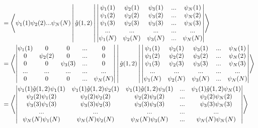 \documentclass[a4paper]{article}
\begin{document}
 \begin{equation}
 \begin{aligned}
 &= \Braket{  \psi_1(1)\psi_2(2)...\psi_N(N)  | \hat{g}(1,2) |
\begin{vmatrix} \psi_1(1) & \psi_2(1)& \psi_3(1) & ... & \psi_N(1) \\
    \psi_1(2) & \psi_2(2) & \psi_3(2) &...& \psi_N(2) \\
    \psi_1(3) & \psi_2(3) & \psi_3(3) &...& \psi_N(3) \\
    ... & ... & ... & ...& ... \\
    \psi_1(N) & \psi_2(N) & \psi_3(N) &...& \psi_N(N)\\
    \end{vmatrix} } \\
    &=
    \Braket{ 
     \begin{vmatrix} \psi_1(1) &0 & 0&... & 0 \\
    0 & \psi_2(2) & 0& ...& 0\\
    0 & 0 & \psi_3(3)& ...& 0\\
    ... & ... & ... & ... &...\\
    0 & 0 & 0&...& \psi_N(N)\\
    \end{vmatrix}  
    |\hat{g}(1,2) |
    \begin{vmatrix} \psi_1(1) & \psi_2(1)& \psi_3(1) & ... & \psi_N(1) \\
    \psi_1(2) & \psi_2(2) & \psi_3(2) &...& \psi_N(2) \\
    \psi_1(3) & \psi_2(3) & \psi_3(3) &...& \psi_N(3) \\
    ... & ... & ... & ...& ... \\
    \psi_1(N) & \psi_2(N) & \psi_3(N) &...& \psi_N(N)\\
    \end{vmatrix} } \\
    &=
      \Braket{ 
     \begin{vmatrix} 
    \psi_1(1)\hat{g}(1,2) \psi_1(1) & \psi_1(1) \hat{g}(1,2) \psi_2(1)& \psi_1(1) \hat{g}(1,2) \psi_3(1) & ... & \psi_1(1)\hat{g}(1,2)\psi_N(1) \\
    \psi_2(2) \psi_1(2) & \psi_2(2)\psi_2(2) & \psi_2(2) \psi_3(2) &...& \psi_2(2)\psi_N(2) \\
    \psi_3(3) \psi_1(3) & \psi_3(3)\psi_2(3) & \psi_3(3) \psi_3(3) &...& \psi_3(3)\psi_N(3) \\
    ... & ... & ... & ...& ... \\
    \psi_N(N) \psi_1(N) &\psi_N(N) \psi_2(N) & \psi_N(N) \psi_3(N) &...& \psi_N(N)\psi_N(N)\\

\end{vmatrix}}
\end{aligned}
\end{equation}
\end{document}
